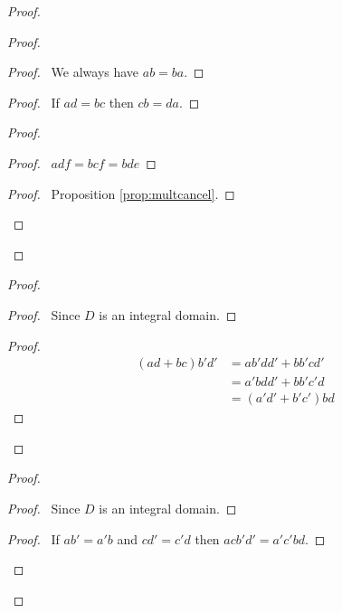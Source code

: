 \documentclass{book}
\let\qed\relax
\theoremstyle{definition}
\begin{document}
\begin{proof}
\pf
{}
\begin{proof}
\pf
{}
\begin{proof}
	\pf\ We always have $ab = ba$.
\end{proof}
\begin{proof}
	\pf\ If $ad = bc$ then $cb = da$.
\end{proof}
\begin{proof}
	\begin{proof}
		\pf\ $adf = bcf = bde$
	\end{proof}
	\begin{proof}
		\pf\ Proposition \ref{prop:multcancel}.
	\end{proof}
\end{proof}
\qed
\end{proof}
\begin{proof}
\pf
{}
\begin{proof}
	\pf\ Since $D$ is an integral domain.
\end{proof}
\begin{proof}
	\pf
	\begin{align*}
		(ad+bc)b'd' & = ab'dd' + bb'cd' \\
		& = a'bdd' + bb'c'd \\
		& = (a'd' + b'c')bd
	\end{align*}
\end{proof}
\qed
\end{proof}
\begin{proof}
\pf
{}
\begin{proof}
	\pf\ Since $D$ is an integral domain.
\end{proof}
\begin{proof}
	\pf\ If $ab' = a'b$ and $cd' = c'd$ then $acb'd' = a'c'bd$.
\end{proof}
\qed
\end{proof}

\end{proof}
\end{document}
